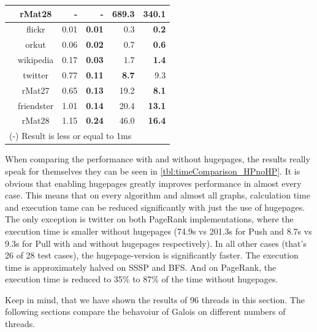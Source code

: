 \begin{table}
\begin{tabular}{ccr@{\tabskip 2 \tabcolsep}rr@{\tabskip 2 \tabcolsep}r}
		& rMat28 & - & - & 689.3 & \bf 340.1 \\
		\midrule
		\multirow{7}{0.5ex}{\rotatebox{90}{\bf PR Pull}}
		& flickr & 0.01 & \bf 0.01 & 0.3 & \bf 0.2 \\
		& orkut & 0.06 & \bf 0.02 & 0.7 & \bf 0.6 \\
		& wikipedia & 0.17 & \bf 0.03 & 1.7 & \bf 1.4 \\
		& twitter & 0.77 & \bf 0.11 & \bf 8.7 & 9.3 \\
		& rMat27 & 0.65 & \bf 0.13 & 19.2 & \bf 8.1 \\
		& friendster & 1.01 & \bf 0.14 & 20.4 & \bf 13.1 \\
		& rMat28 & 1.15 & \bf 0.24 & 46.0 & \bf 16.4 \\
		\bottomrule
		\multicolumn{6}{l}{(-) Result is less or equal to 1ms}
	\end{tabular}
\end{table}
When comparing the performance with and without hugepages, the results really speak for themselves they can be seen in \autoref{tbl:timeComparison_HPnoHP}. It is obvious that enabling hugepages greatly improves performance in almost every case. This means that on every algorithm and almost all graphs, calculation time and execution tame can be reduced significantly with just the use of hugepages. The only exception is twitter on both PageRank implementations, where the execution time is smaller without hugepages (74.9s vs 201.3s for Push and 8.7s vs 9.3s for Pull with and without hugepages respectively). In all other cases (that's 26 of 28 test cases), the hugepage-version is significantly faster.
The execution time is approximately halved on SSSP and BFS. And on PageRank, the execution time is reduced to 35\% to 87\% of the time without hugepages.

Keep in mind, that we have shown the results of 96 threads in this section. The following sections compare the behavoiur of Galois on different numbers of threads.

